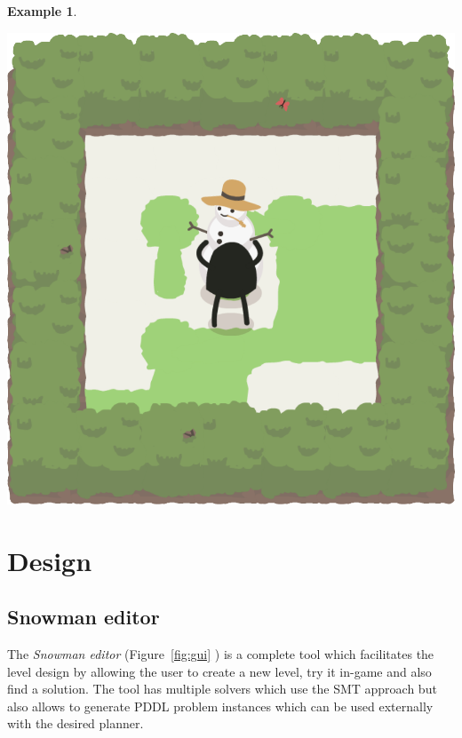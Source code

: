 \documentclass{report}
\theoremstyle{plain}
\newtheorem{example}{Example}[section]
\begin{document}
\begin{example}
\begin{center}
\includegraphics[width=\andyWidth\textwidth]{andy-basic-21.png}
\end{center}
\end{example}

\chapter{Design}
\section{Snowman editor}
The \emph{Snowman editor} (Figure~\ref{fig:gui} ) is a complete tool which facilitates the level design by allowing the user to create a new level, try it in-game and also find a solution. The tool has multiple solvers which use the SMT approach but also allows to generate PDDL problem instances which can be used externally with the desired planner.
\end{document}
